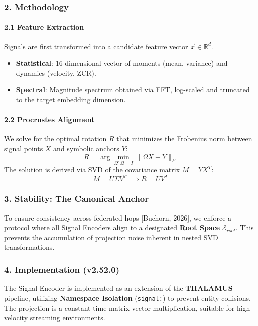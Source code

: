 \subsubsection{2. Methodology}

\paragraph{2.1 Feature Extraction}
Signals are first transformed into a candidate feature vector $\vec{x} \in \mathbb{R}^d$.
\begin{itemize}
\item \textbf{Statistical}: 16-dimensional vector of moments (mean, variance) and dynamics (velocity, ZCR).
\item \textbf{Spectral}: Magnitude spectrum obtained via FFT, log-scaled and truncated to the target embedding dimension.

\end{itemize}
\paragraph{2.2 Procrustes Alignment}
We solve for the optimal rotation $R$ that minimizes the Frobenius norm between signal points $X$ and symbolic anchors $Y$:
\begin{equation}
R = \arg\min_{\Omega^T\Omega=I} \| \Omega X - Y \|_F
\end{equation}
The solution is derived via SVD of the covariance matrix $M = Y X^T$:
\begin{equation}
M = U \Sigma V^T \implies R = U V^T
\end{equation}

\subsubsection{3. Stability: The Canonical Anchor}
To ensure consistency across federated hops [Buchorn, 2026], we enforce a protocol where all Signal Encoders align to a designated \textbf{Root Space} $\mathcal{E}_{root}$. This prevents the accum\-ulation of projection noise inherent in nested SVD trans\-formations.

\subsubsection{4. Implem\-entation (v2.52.0)}
The Signal Encoder is implemented as an extension of the \textbf{THALAMUS} pipeline, utilizing \textbf{Namespace Isolation} (\texttt{signal:}) to prevent entity collisions. The projection is a constant-time matrix-vector multi\-plication, suitable for high-velocity streaming envir\-onments.

